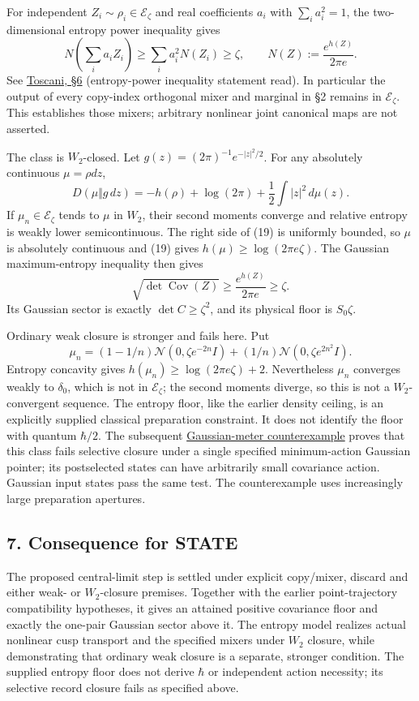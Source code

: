 \documentclass[11pt,a4paper]{article}
\begin{document}
For independent \(Z_i\sim\rho_i\in\mathcal E_\zeta\) and real
coefficients \(a_i\) with \(\sum_i a_i^2=1\), the two-dimensional
entropy power inequality gives \[
 N\!\left(\sum_i a_iZ_i\right)
 \ge\sum_i a_i^2 N(Z_i)\ge\zeta,\qquad
 N(Z):=\frac{e^{h(Z)}}{2\pi e}.\tag{18}
\] See
\href{https://mate.unipv.it/toscani/publi/Convolution.pdf}{Toscani, §6}
(entropy-power inequality statement read). In particular the output of
every copy-index orthogonal mixer and marginal in §2 remains in
\(\mathcal E_\zeta\). This establishes those mixers; arbitrary nonlinear
joint canonical maps are not asserted.

The class is \(W_2\)-closed. Let \(g(z)=(2\pi)^{-1}e^{-|z|^2/2}\). For
any absolutely continuous \(\mu=\rho dz\), \[
 D(\mu\Vert g\,dz)
 =-h(\rho)+\log(2\pi)+\frac12\int |z|^2\,d\mu(z).\tag{19}
\] If \(\mu_n\in\mathcal E_\zeta\) tends to \(\mu\) in \(W_2\), their
second moments converge and relative entropy is weakly lower
semicontinuous. The right side of (19) is uniformly bounded, so \(\mu\)
is absolutely continuous and (19) gives \(h(\mu)\ge\log(2\pi e\zeta)\).
The Gaussian maximum-entropy inequality then gives \[
 \sqrt{\det\operatorname{Cov}(Z)}
 \ge \frac{e^{h(Z)}}{2\pi e}\ge\zeta.\tag{20}
\] Its Gaussian sector is exactly \(\det C\ge\zeta^2\), and its physical
floor is \(S_0\zeta\).

Ordinary weak closure is stronger and fails here. Put \[
 \mu_n=(1-1/n)\mathcal N(0,\zeta e^{-2n}I)
       +(1/n)\mathcal N(0,\zeta e^{2n^2}I).\tag{21}
\] Entropy concavity gives \(h(\mu_n)\ge\log(2\pi e\zeta)+2\).
Nevertheless \(\mu_n\) converges weakly to \(\delta_0\), which is not in
\(\mathcal E_\zeta\); the second moments diverge, so this is not a
\(W_2\)-convergent sequence. The entropy floor, like the earlier density
ceiling, is an explicitly supplied classical preparation constraint. It
does not identify the floor with quantum \(\hbar/2\). The subsequent
\href{gaussian-meter-entropy-floor.md}{Gaussian-meter counterexample}
proves that this class fails selective closure under a single specified
minimum-action Gaussian pointer; its postselected states can have
arbitrarily small covariance action. Gaussian input states pass the same
test. The counterexample uses increasingly large preparation apertures.

\hypertarget{consequence-for-state}{%
\subsection{7. Consequence for STATE}\label{consequence-for-state}}

The proposed central-limit step is settled under explicit copy/mixer,
discard and either weak- or \(W_2\)-closure premises. Together with the
earlier point-trajectory compatibility hypotheses, it gives an attained
positive covariance floor and exactly the one-pair Gaussian sector above
it. The entropy model realizes actual nonlinear cusp transport and the
specified mixers under \(W_2\) closure, while demonstrating that
ordinary weak closure is a separate, stronger condition. The supplied
entropy floor does not derive \(\hbar\) or independent action necessity;
its selective record closure fails as specified above.
\end{document}
